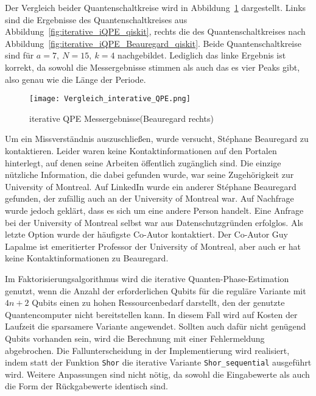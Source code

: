 Der Vergleich beider Quantenschaltkreise wird in Abbildung~\ref{fig:iterative_iQPE_Vergleich} dargestellt.
Links sind die Ergebnisse des Quantenschaltkreises aus Abbildung~\ref{fig:iterative_iQPE_qiskit}, 
rechts die des Quantenschaltkreises nach Abbildung~\ref{fig:iterative_iQPE_Beauregard_qiskit}.
Beide Quantenschaltkreise sind für \(a = 7,~N=15,~k=4\) nachgebildet.
Lediglich das linke Ergebnis ist korrekt, 
da sowohl die Messergebnisse stimmen als auch das es vier Peaks gibt, 
also genau wie die Länge der Periode.


\begin{figure} [H]
  \caption{iterative QPE Messergebnisse(Beauregard rechts)}
  \label{fig:iterative_iQPE_Vergleich}
  \texttt{[image: Vergleich\_interative\_QPE.png]}
  \centering
  \end{figure}

Um ein Missverständnis auszuschließen, wurde versucht, Stéphane Beauregard zu kontaktieren. 
Leider waren keine Kontaktinformationen auf den Portalen hinterlegt, 
auf denen seine Arbeiten öffentlich zugänglich sind. 
Die einzige nützliche Information, die dabei gefunden wurde, 
war seine Zugehörigkeit zur University of Montreal. 
Auf LinkedIn wurde ein anderer Stéphane Beauregard gefunden, 
der zufällig auch an der University of Montreal war. Auf Nachfrage wurde jedoch geklärt, 
dass es sich um eine andere Person handelt. 
Eine Anfrage bei der University of Montreal selbst war aus Datenschutzgründen erfolglos. 
Als letzte Option wurde der häufigste Co-Autor kontaktiert. 
Der Co-Autor Guy Lapalme ist emeritierter Professor der University of Montreal, 
aber auch er hat keine Kontaktinformationen zu Beauregard.

\vspace{1em}

Im Faktorisierungsalgorithmus wird die iterative Quanten-Phase-Estimation genutzt, 
wenn die Anzahl der erforderlichen Qubits für die reguläre Variante mit \(4n+2\) Qubits einen zu hohen Ressourcenbedarf darstellt, 
den der genutzte Quantencomputer nicht bereitstellen kann. 
In diesem Fall wird auf Kosten der Laufzeit die sparsamere Variante angewendet. 
Sollten auch dafür nicht genügend Qubits vorhanden sein, 
wird die Berechnung mit einer Fehlermeldung abgebrochen. 
Die Fallunterscheidung in der Implementierung wird realisiert, 
indem statt der Funktion \texttt{Shor} die iterative Variante \texttt{Shor\_sequential} ausgeführt wird. 
Weitere Anpassungen sind nicht nötig, 
da sowohl die Eingabewerte als auch die Form der Rückgabewerte identisch sind.

